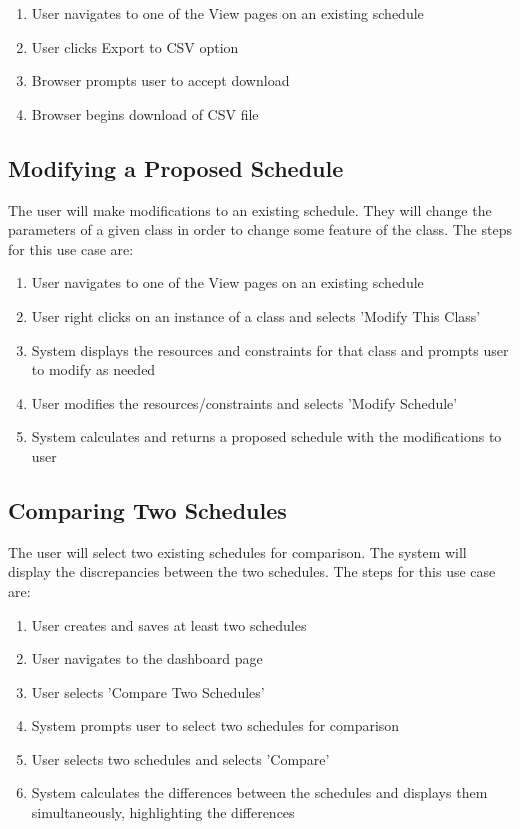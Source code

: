 \documentclass{extarticle}
\begin{document}
\begin{enumerate}
\item User navigates to one of the View pages on an existing schedule
\item User clicks Export to CSV option
\item Browser prompts user to accept download
\item Browser begins download of CSV file
\end{enumerate}


\subsection{Modifying a Proposed Schedule}
The user will make modifications to an existing schedule.  They will change the parameters of a given class in
order to change some feature of the class.  The steps for this use case are:

\begin{enumerate}
\item User navigates to one of the View pages on an existing schedule
\item User right clicks on an instance of a class and selects 'Modify This Class'
\item System displays the resources and constraints for that class and prompts user to modify as needed
\item User modifies the resources/constraints and selects 'Modify Schedule'
\item System calculates and returns a proposed schedule with the modifications to user
\end{enumerate}


\subsection{Comparing Two Schedules}
The user will select two existing schedules for comparison.  The system will display the discrepancies between the
two schedules.  The steps for this use case are:

\begin{enumerate}
\item User creates and saves at least two schedules
\item User navigates to the dashboard page
\item User selects 'Compare Two Schedules'
\item System prompts user to select two schedules for comparison
\item User selects two schedules and selects 'Compare'
\item System calculates the differences between the schedules and displays them simultaneously, highlighting the
differences
\end{enumerate}
\end{document}

